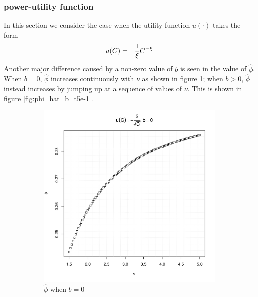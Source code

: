 \documentclass{article}
\begin{document}
\subsubsection{power-utility function}
In this section we consider the case when the utility function
$u(\cdot)$ takes the form
\[
u(C) = -{1 \over \xi} C^{-\xi}
\]
Another major difference caused by a non-zero value of $b$ is seen in
the value of $\hat\phi$. When $b = 0$, $\hat\phi$ increases
continuously with $\nu$ as shown in figure \ref{fig:phi_hat_t5e-1};
when $b > 0$, $\hat\phi$ instead increases by jumping up at a sequence
of values of $\nu$. This is shown in figure \ref{fig:phi_hat_b_t5e-1}.
\begin{figure}[htb!]
  \begin{subfigure}[b]{0.5\linewidth}
    \includegraphics[width=\textwidth]{phi_hat_t5e-1.pdf}
    \caption{$\hat\phi$ when $b = 0$}
    \label{fig:phi_hat_t5e-1}
  \end{subfigure}
  \begin{subfigure}[b]{0.5\linewidth}

\end{subfigure}
\end{figure}
\end{document}
